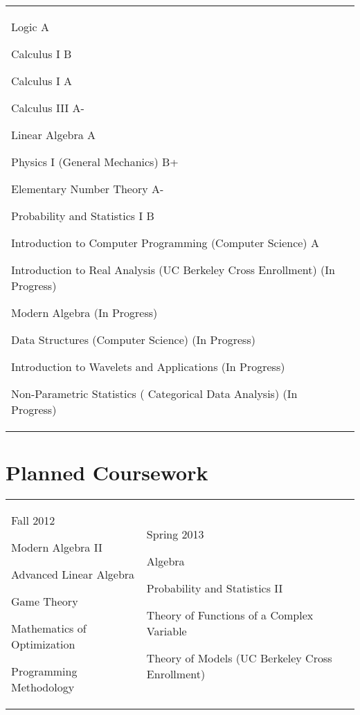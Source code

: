 \documentclass[margin,line,pifont,palatino,courier]{res}
\newenvironment{list1}{
  \begin{list}{\ding{113}}{%
      \setlength{\itemsep}{0in}
      \setlength{\parsep}{0in} \setlength{\parskip}{0in}
      \setlength{\topsep}{0in} \setlength{\partopsep}{0in}
      \setlength{\leftmargin}{0.17in}}}{\end{list}}
\begin{document}
\begin{resume}
\begin{tabular}{@{}p{5in}p{3in}}
\begin{list1}
\item Logic A
\item Calculus I B
\item Calculus I A

\item Calculus  III A-
\item Linear Algebra A
\item Physics I  (General Mechanics)  B+

\item Elementary Number Theory A- 

\item Probability and Statistics I  B
\item Introduction to Computer Programming (Computer  Science)  A
\item Introduction to Real Analysis  (UC Berkeley Cross Enrollment) (In Progress)
\item Modern Algebra  (In Progress)
\item Data Structures (Computer  Science)  (In Progress)
\item Introduction to Wavelets and Applications  (In Progress)
\item Non-Parametric Statistics ( Categorical Data Analysis)  (In Progress)

\end{list1}

\end{tabular}

\section{\sc Planned Coursework}

\begin{tabular}{@{}p{2.5in}p{2.5in}}
Fall 2012
\begin{list1}

\item Modern Algebra II
\item Advanced Linear Algebra
\item Game Theory
\item  Mathematics of Optimization
\item Programming Methodology 

\end{list1}
&
Spring 2013
\begin{list1}


\item Algebra
\item Probability and Statistics II
\item	Theory of Functions of a Complex Variable
\item Theory of Models (UC Berkeley Cross Enrollment)


\end{list1}
\end{tabular}
\end{resume}
\end{document}
